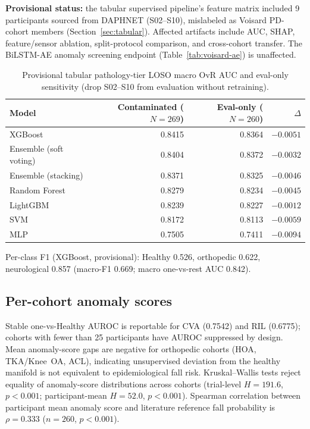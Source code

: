 \textbf{Provisional status:} the tabular supervised pipeline's feature matrix included 9 participants sourced from DAPHNET (S02--S10), mislabeled as Voisard PD-cohort members (Section~\ref{sec:tabular}). Affected artifacts include AUC, SHAP, feature/sensor ablation, split-protocol comparison, and cross-cohort transfer. The BiLSTM-AE anomaly screening endpoint (Table~\ref{tab:voisard-ae}) is unaffected.

\begin{table}[ht]
\centering
\caption{Provisional tabular pathology-tier LOSO macro OvR AUC and eval-only sensitivity (drop S02--S10 from evaluation without retraining).}
\label{tab:tabular}
\begin{tabular}{lrrr}
\toprule
Model & Contaminated ($N{=}269$) & Eval-only ($N{=}260$) & $\Delta$ \\
\midrule
XGBoost & 0.8415 & 0.8364 & $-0.0051$ \\
Ensemble (soft voting) & 0.8404 & 0.8372 & $-0.0032$ \\
Ensemble (stacking) & 0.8371 & 0.8325 & $-0.0046$ \\
Random Forest & 0.8279 & 0.8234 & $-0.0045$ \\
LightGBM & 0.8239 & 0.8227 & $-0.0012$ \\
SVM & 0.8172 & 0.8113 & $-0.0059$ \\
MLP & 0.7505 & 0.7411 & $-0.0094$ \\
\bottomrule
\end{tabular}
\end{table}

Per-class F1 (XGBoost, provisional): Healthy 0.526, orthopedic 0.622, neurological 0.857 (macro-F1 0.669; macro one-vs-rest AUC 0.842).

\subsection{Per-cohort anomaly scores}

Stable one-vs-Healthy AUROC is reportable for CVA (0.7542) and RIL (0.6775); cohorts with fewer than 25 participants have AUROC suppressed by design. Mean anomaly-score gaps are negative for orthopedic cohorts (HOA, TKA/Knee~OA, ACL), indicating unsupervised deviation from the healthy manifold is not equivalent to epidemiological fall risk. Kruskal--Wallis tests reject equality of anomaly-score distributions across cohorts (trial-level $H=191.6$, $p<0.001$; participant-mean $H=52.0$, $p<0.001$). Spearman correlation between participant mean anomaly score and literature reference fall probability is $\rho=0.333$ ($n=260$, $p<0.001$).

